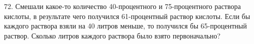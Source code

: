 72. Смешали какое-то количество 40-процентного и 75-процентного раствора кислоты, в результате чего получился 61-процентный раствор кислоты. Если бы каждого раствора взяли на 40 литров меньше, то получился бы 65-процентный раствор. Сколько литров каждого раствора было взято первоначально?\\
